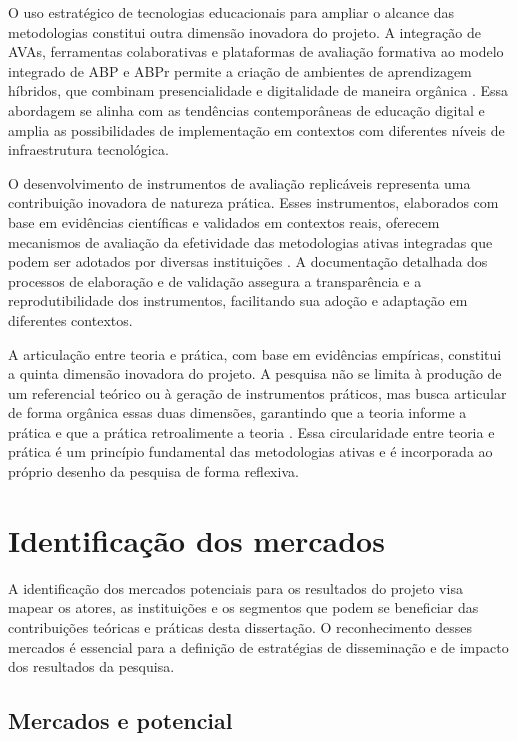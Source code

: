 O uso estratégico de tecnologias educacionais para ampliar o alcance das metodologias constitui outra dimensão inovadora do projeto. A integração de AVAs, ferramentas colaborativas e plataformas de avaliação formativa ao modelo integrado de ABP e ABPr permite a criação de ambientes de aprendizagem híbridos, que combinam presencialidade e digitalidade de maneira orgânica \cite{SELWYN2022}. Essa abordagem se alinha com as tendências contemporâneas de educação digital e amplia as possibilidades de implementação em contextos com diferentes níveis de infraestrutura tecnológica.

O desenvolvimento de instrumentos de avaliação replicáveis representa uma contribuição inovadora de natureza prática. Esses instrumentos, elaborados com base em evidências científicas e validados em contextos reais, oferecem mecanismos de avaliação da efetividade das metodologias ativas integradas que podem ser adotados por diversas instituições \cite{BLACK1998}. A documentação detalhada dos processos de elaboração e de validação assegura a transparência e a reprodutibilidade dos instrumentos, facilitando sua adoção e adaptação em diferentes contextos.

A articulação entre teoria e prática, com base em evidências empíricas, constitui a quinta dimensão inovadora do projeto. A pesquisa não se limita à produção de um referencial teórico ou à geração de instrumentos práticos, mas busca articular de forma orgânica essas duas dimensões, garantindo que a teoria informe a prática e que a prática retroalimente a teoria \cite{CRESWELL2018}. Essa circularidade entre teoria e prática é um princípio fundamental das metodologias ativas e é incorporada ao próprio desenho da pesquisa de forma reflexiva.

\section{Identificação dos mercados}
\label{sec:mercados}

A identificação dos mercados potenciais para os resultados do projeto visa mapear os atores, as instituições e os segmentos que podem se beneficiar das contribuições teóricas e práticas desta dissertação. O reconhecimento desses mercados é essencial para a definição de estratégias de disseminação e de impacto dos resultados da pesquisa.

\subsection{Mercados e potencial}
\label{subsec:merc_potencial}

